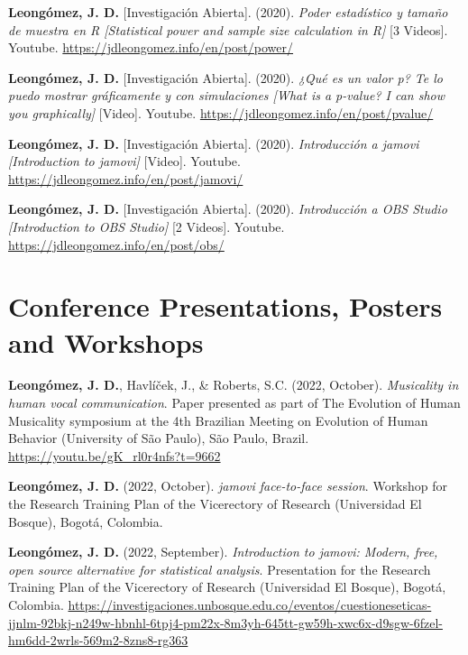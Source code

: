 \documentclass[11pt,a4paper,]{awesome-cv}
\begin{document}
\textbf{Leongómez, J. D.} {[}Investigación Abierta{]}. (2020).
\emph{Poder estadístico y tamaño de muestra en R {[}Statistical power
and sample size calculation in R{]}} {[}3 Videos{]}. Youtube.
\url{https://jdleongomez.info/en/post/power/}

\textbf{Leongómez, J. D.} {[}Investigación Abierta{]}. (2020).
\emph{¿Qué es un valor p? Te lo puedo mostrar gráficamente y con
simulaciones {[}What is a p-value? I can show you graphically{]}}
{[}Video{]}. Youtube. \url{https://jdleongomez.info/en/post/pvalue/}

\textbf{Leongómez, J. D.} {[}Investigación Abierta{]}. (2020).
\emph{Introducción a jamovi {[}Introduction to jamovi{]}} {[}Video{]}.
Youtube. \url{https://jdleongomez.info/en/post/jamovi/}

\textbf{Leongómez, J. D.} {[}Investigación Abierta{]}. (2020).
\emph{Introducción a OBS Studio {[}Introduction to OBS Studio{]}} {[}2
Videos{]}. Youtube. \url{https://jdleongomez.info/en/post/obs/}

\endgroup

\hypertarget{conference-presentations-posters-and-workshops}{%
\section{Conference Presentations, Posters and
Workshops}\label{conference-presentations-posters-and-workshops}}

\begingroup
\setlength{\parindent}{-0.5in}
\setlength{\leftskip}{0.5in}

\textbf{Leongómez, J. D.}, Havlíček, J., \& Roberts, S.C. (2022,
October). \emph{Musicality in human vocal communication}. Paper
presented as part of The Evolution of Human Musicality symposium at the
4th Brazilian Meeting on Evolution of Human Behavior (University of São
Paulo), São Paulo, Brazil. \url{https://youtu.be/gK_rl0r4nfs?t=9662}

\textbf{Leongómez, J. D.} (2022, October). \emph{jamovi face-to-face
session}. Workshop for the Research Training Plan of the Vicerectory of
Research (Universidad El Bosque), Bogotá, Colombia.

\textbf{Leongómez, J. D.} (2022, September). \emph{Introduction to
jamovi: Modern, free, open source alternative for statistical analysis}.
Presentation for the Research Training Plan of the Vicerectory of
Research (Universidad El Bosque), Bogotá, Colombia.
\url{https://investigaciones.unbosque.edu.co/eventos/cuestioneseticas-jjnlm-92bkj-n249w-hbnhl-6tpj4-pm22x-8m3yh-645tt-gw59h-xwc6x-d9sgw-6fzel-hm6dd-2wrls-569m2-8zns8-rg363}
\end{document}
